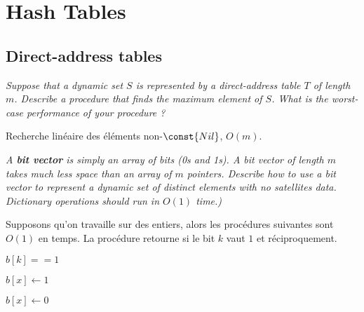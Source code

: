 \section{Hash Tables}

\subsection{Direct-address tables}
\label{sub:direct_address_tables}

\begin{description}

 \textit{Suppose that a dynamic set $S$ is represented by a direct-address table $T$ of length $m$. Describe a procedure that finds the maximum element of $S$. What is the worst-case performance of your procedure ?}

\begin{ex}
  Recherche linéaire des éléments non-$\const{Nil}$, $O(m)$.
\end{ex}

 \textit{A \textbf{bit vector} is simply an array of bits (0s and 1s). A bit vector of length $m$ takes much less space than an array of $m$ pointers. Describe how to use a bit vector to represent a dynamic set of distinct elements with no satellites data. Dictionary operations should run in $O(1)$ time.)}

\begin{ex}

Supposons qu'on travaille sur des entiers, alors les procédures suivantes sont $O(1)$ en temps. La procédure  retourne  si le bit $k$ vaut $1$ et réciproquement.

\begin{codebox}
   \li \If $b[k] == 1$
\end{codebox}
\begin{codebox}
   \li \Return $b[x] \gets 1$
\end{codebox}
\begin{codebox}
   \li \Return $b[x] \gets 0$
\end{codebox}
\end{ex}

 \textit{}

 \textit{}


\end{description}


